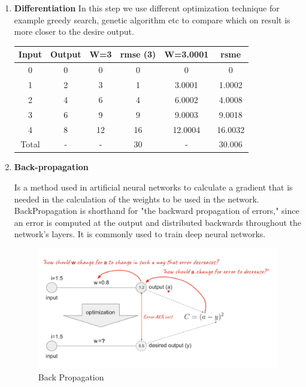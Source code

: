 \begin{enumerate}
   \item \textbf{Differentiation} \newline
    In this step we use different optimization technique for example greedy search, genetic algorithm etc to compare which on result is more closer to the desire output. 
    

\begin{table}[h!]
\centering
 \begin{tabular}{|c|c|c|c|c|c|} 
 \hline
 Input & Output & W=3 & rmse (3) & W=3.0001 & rsme \\ [0.5ex] 
 \hline\hline
 0 & 0 & 0 & 0 & 0 & 0\\ 
 1 & 2 & 3 & 1 & 3.0001 & 1.0002\\
 2 & 4 & 6 & 4 & 6.0002 & 4.0008\\
 3 & 6 & 9 & 9 & 9.0003 & 9.0018\\
 4 & 8 & 12 & 16 & 12.0004 & 16.0032\\
 Total & - & - & 30 & - & 30.006 \\[1ex] 
 \hline
 \end{tabular}
\end{table}
\vspace{20mm}

    \item \textbf{Back-propagation} 
        \par Is a method used in artificial neural networks to calculate a gradient that is needed in the calculation of the weights to be used in the network. BackPropagation is shorthand for "the backward propagation of errors," since an error is computed at the output and distributed backwards throughout the network’s layers. It is commonly used to train deep neural networks.
        \begin{figure}[h1]
             \centering 
             \includegraphics[scale=0.5]{figures/BackProDefine.png}
             \caption{Back Propagation}
        \end{figure} \newline 


\end{enumerate}
